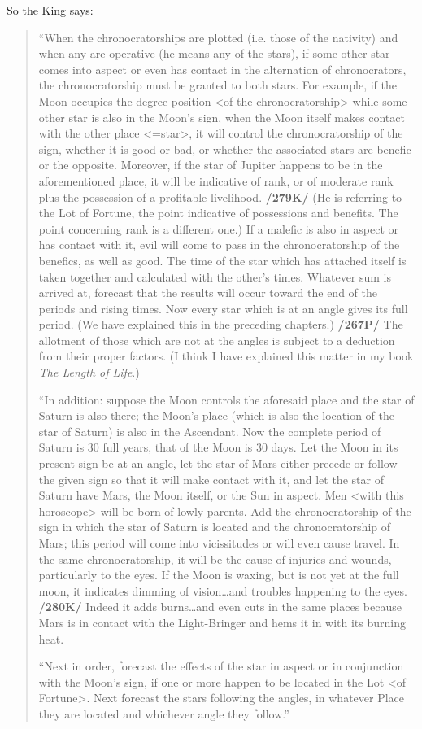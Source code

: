 So the King says:
\begin{quote}
“When the chronocratorships are plotted (i.e. those of the nativity) and when any are operative (he means any of the stars), if some other star comes into aspect or even has contact in the alternation of
chronocrators, the chronocratorship must be granted to both stars. For example, if the Moon occupies the degree-position <of the chronocratorship> while some other star is also in the Moon’s
sign, when the Moon itself makes contact with the other place <=star>, it will control the chronocratorship of the sign, whether it is good or bad, or whether the associated stars are benefic or
the opposite. Moreover, if the star of Jupiter happens to be in the aforementioned place, it will be indicative of rank, or of moderate rank plus the possession of a profitable livelihood. \textbf{/279K/} (He is
referring to the Lot of Fortune, the point indicative of possessions and benefits. The point concerning rank is a different one.) If a malefic is also in aspect or has contact with it, evil will come to pass in the chronocratorship of the benefics, as well as good. The time of the star which has attached itself is taken together and calculated with the other’s times. Whatever sum is arrived at, forecast that the results will occur toward the end of the periods and rising times. Now every star
which is at an angle gives its full period. (We have explained this in the preceding chapters.) \textbf{/267P/} The allotment of those which are not at the angles is subject to a deduction from their proper factors. (I think I have explained this matter in my book \textit{The Length of Life}.)

“In addition: suppose the Moon controls the aforesaid place and the star of Saturn is also there; the Moon’s place (which is also the location of the star of Saturn) is also in the Ascendant. Now the
complete period of Saturn is 30 full years, that of the Moon is 30 days. Let the Moon in its present sign be at an angle, let the star of Mars either precede or follow the given sign so that it will make contact with it, and let the star of Saturn have Mars, the Moon itself, or the Sun in aspect. Men <with this horoscope> will be born of lowly parents. Add the chronocratorship of the sign in which the star of Saturn is located and the chronocratorship of Mars; this period will come into vicissitudes or will even cause travel. In the same chronocratorship, it will be the cause of injuries and wounds, particularly to the eyes. If the Moon is waxing, but is not yet at the full moon, it indicates dimming of vision…and troubles happening to the eyes. \textbf{/280K/} Indeed it adds burns…and even cuts in the same places because Mars is in contact with the Light-Bringer and hems it in with its burning heat.

“Next in order, forecast the effects of the star in aspect or in conjunction with the Moon’s sign, if one or more happen to be located in the Lot <of Fortune>. Next forecast the stars following the
angles, in whatever Place they are located and whichever angle they follow.”
\end{quote}

